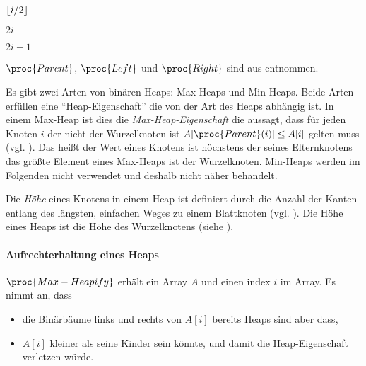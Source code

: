 \begin{codebox}
    \li \Return $\left\lfloor i/2 \right\rfloor$
\end{codebox}

\begin{codebox}
    \li \Return $2i$
\end{codebox}

\begin{codebox}
    \li \Return $2i + 1$
\end{codebox}

$\proc{Parent}$, $\proc{Left}$ und $\proc{Right}$ sind aus \cite[152]{clrs2001} entnommen.

Es gibt zwei Arten von binären Heaps: Max-Heaps und Min-Heaps. Beide Arten erfüllen eine \enquote{Heap-Eigenschaft} die von der Art des Heaps abhängig ist. In einem Max-Heap ist dies die \emph{Max-Heap-Eigenschaft} die aussagt, dass für jeden Knoten $i$ der nicht der Wurzelknoten ist $A[\proc{Parent}(i)] \leq A[i]$ gelten muss (vgl. \cite[92]{hsr1997}). Das heißt der Wert eines Knotens ist höchstens der seines Elternknotens das größte Element eines Max-Heaps ist der Wurzelknoten. Min-Heaps werden im Folgenden nicht verwendet und deshalb nicht näher behandelt.

Die \emph{Höhe} eines Knotens in einem Heap ist definiert durch die Anzahl der Kanten entlang des längsten, einfachen Weges zu einem Blattknoten (vgl. \cite[153]{clrs2001}). Die Höhe eines Heaps ist die Höhe des Wurzelknotens (siehe ).



\paragraph{Aufrechterhaltung eines Heaps}

$\proc{Max-Heapify}$ erhält ein Array $A$ und einen index $i$ im Array. Es nimmt an, dass
\begin{itemize}
    \item die Binärbäume links und rechts von $A[i]$ bereits Heaps sind aber dass,
    \item $A[i]$ kleiner als seine Kinder sein könnte, und damit die Heap-Eigenschaft verletzen würde.
\end{itemize}

